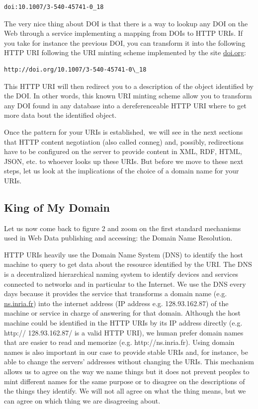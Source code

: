 \begin{lstlisting}
doi:10.1007/3-540-45741-0_18
\end{lstlisting}


The very nice thing about DOI is that there is a way to lookup any DOI
on the Web through a service implementing a mapping from DOIs to HTTP
URIs. If you take for instance the previous DOI, you can transform it
into the following HTTP URI following the URI minting scheme implemented
by the site \href{https://www.doi.org/}{doi.org}:

\begin{lstlisting}
http://doi.org/10.1007/3-540-45741-0\_18
\end{lstlisting}


This HTTP URI will then redirect you to a description of the object
identified by the DOI. In other words, this known URI minting scheme
allow you to transform any DOI found in any database into a
dereferenceable HTTP URI where to get more data bout the identified
object.

Once the pattern for your URIs is established,~we will see in the next
sections that HTTP content negotiation (also called conneg) and,
possibly, redirections have to be configured on the server to provide
content in XML, RDF, HTML, JSON, etc. to whoever looks up these URIs.
But before we move to these next steps, let us look at the implications
of the choice of a domain name for your URIs.

\hypertarget{king-of-my-domain}{%
\subsection{King of My Domain}\label{king-of-my-domain}}

Let us now come back to figure 2 and zoom on the first standard
mechanisms used in Web Data publishing and accessing: the Domain Name
Resolution.

HTTP URIs heavily use the Domain Name System (DNS) to identify the host
machine to query to get data about the resource identified by the URI.
The DNS is a decentralized hierarchical naming system to identify
devices and services connected to networks and in particular to the
Internet. We use the DNS every days because it provides the service that
transforms a domain name (e.g. \href{http://www.inria.fr}{ns.inria.fr})
into the internet address (IP address e.g. 128.93.162.87) of the machine
or service in charge of answering for that domain. Although the host
machine could be identified in the HTTP URIs by its IP address directly
(e.g. http:// 128.93.162.87/ is a valid HTTP URI), we human prefer
domain names that are easier to read and memorize (e.g.
http://ns.inria.fr). Using domain names is also important in our case to
provide stable URIs and, for instance, be able to change the servers'
addresses without changing the URIs. This mechanism allows us to agree
on the way we name things but it does not prevent peoples to mint
different names for the same purpose or to disagree on the descriptions
of the things they identify. We will not all agree on what the thing
means, but we can agree on which thing we are disagreeing about.

